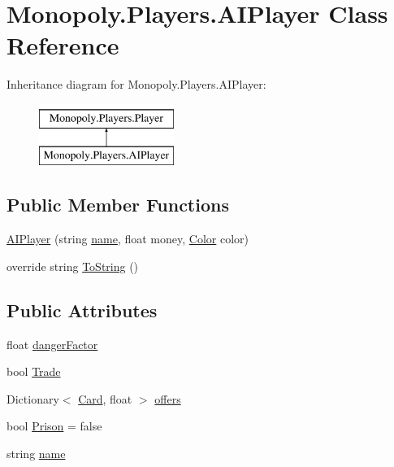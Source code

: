 \hypertarget{class_monopoly_1_1_players_1_1_a_i_player}{}\section{Monopoly.\+Players.\+A\+I\+Player Class Reference}
\label{class_monopoly_1_1_players_1_1_a_i_player}
Inheritance diagram for Monopoly.\+Players.\+A\+I\+Player\+:\begin{figure}[H]
\begin{center}
\leavevmode
\includegraphics[height=2.000000cm]{class_monopoly_1_1_players_1_1_a_i_player}
\end{center}
\end{figure}
\subsection*{Public Member Functions}
\begin{DoxyCompactItemize}
\item 
\mbox{\hyperlink{class_monopoly_1_1_players_1_1_a_i_player_abcfe138a31c6f2c27d0cfc2771700d39}{A\+I\+Player}} (string \mbox{\hyperlink{class_monopoly_1_1_players_1_1_player_a554b9887d583e93fc182fb5cf43a08c8}{name}}, float money, \mbox{\hyperlink{class_monopoly_1_1_players_1_1_player_afcfd5b9c28b6ba4ce1e60e2e3baf7e31}{Color}} color)
\item 
override string \mbox{\hyperlink{class_monopoly_1_1_players_1_1_player_a7f052d67464f27df644c9b2a903593ba}{To\+String}} ()
\end{DoxyCompactItemize}
\subsection*{Public Attributes}
\begin{DoxyCompactItemize}
\item 
float \mbox{\hyperlink{class_monopoly_1_1_players_1_1_a_i_player_aa65ee785cb792c3289888e91129ee322}{danger\+Factor}}
\item 
bool \mbox{\hyperlink{class_monopoly_1_1_players_1_1_a_i_player_a7bc13232788c1c8b395ec34214f45694}{Trade}}
\item 
Dictionary$<$ \mbox{\hyperlink{class_monopoly_1_1_cards_1_1_card}{Card}}, float $>$ \mbox{\hyperlink{class_monopoly_1_1_players_1_1_a_i_player_ab2b78f249717d9cbb9d213555a832ee7}{offers}}
\item 
bool \mbox{\hyperlink{class_monopoly_1_1_players_1_1_player_a308be52351bb6ad3e287e24f2fb04999}{Prison}} = false
\item 
string \mbox{\hyperlink{class_monopoly_1_1_players_1_1_player_a554b9887d583e93fc182fb5cf43a08c8}{name}}
\end{DoxyCompactItemize}
